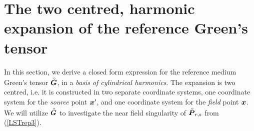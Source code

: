 \section{The two centred, harmonic expansion of the reference Green's tensor}
In this section, we derive a closed form expression for the 
reference medium Green's tensor $\stackrel{\scriptscriptstyle _{\,\,\circ}}{ \mbox{\boldmath$\mit G$\unboldmath}}$, in a {\em basis of cylindrical harmonics\/}. 
The expansion is two centred, i.e. it is constructed in two separate coordinate 
systems, one coordinate system for the {\em source\/} point
${\mbox{\boldmath$\mit x$\unboldmath}}^{\prime}$, and one coordinate system for the {\em field\/} point  ${\mbox{\boldmath$\mit x$\unboldmath}}$.
We will utilize $\stackrel{\scriptscriptstyle _{\,\,\circ}}{ \mbox{\boldmath$\mit G$\unboldmath}}$ to investigate the near field 
singularity of ${\stackrel{\scriptscriptstyle _{\,\,\circ}}{ \mbox{\boldmath$\mit P$\unboldmath}}}_{r,s}$ from (\ref{LSTrep3}).

